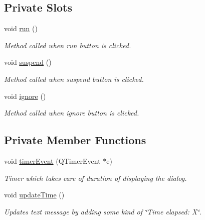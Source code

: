 \subsection*{Private Slots}
\begin{DoxyCompactItemize}
\item 
void \hyperlink{class_msg_box_with_duration_a31849031f1c2ec36acd519f52859b9e6}{run} ()
\begin{DoxyCompactList}\small\item\em Method called when run button is clicked. \end{DoxyCompactList}\item 
void \hyperlink{class_msg_box_with_duration_a96b7f825ac6a3d91dc5b44adbb7d2316}{suspend} ()
\begin{DoxyCompactList}\small\item\em Method called when suspend button is clicked. \end{DoxyCompactList}\item 
void \hyperlink{class_msg_box_with_duration_ad943eace2160d6a804e7e22fe3b8c2a2}{ignore} ()
\begin{DoxyCompactList}\small\item\em Method called when ignore button is clicked. \end{DoxyCompactList}\end{DoxyCompactItemize}
\subsection*{Private Member Functions}
\begin{DoxyCompactItemize}
\item 
void \hyperlink{class_msg_box_with_duration_a4dbdb2e667a57300f94cbd5b0a0d645a}{timer\-Event} (Q\-Timer\-Event $\ast$e)
\begin{DoxyCompactList}\small\item\em Timer which takes care of duration of displaying the dialog. \end{DoxyCompactList}\item 
void \hyperlink{class_msg_box_with_duration_a6250474fea961afd886f654d716b8a3b}{update\-Time} ()
\begin{DoxyCompactList}\small\item\em Updates text message by adding some kind of \char`\"{}\-Time elapsed\-: X\char`\"{}. \end{DoxyCompactList}\end{DoxyCompactItemize}

